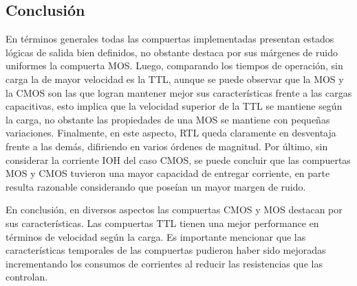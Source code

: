 \subsection{Conclusión}
En t\'erminos generales todas las compuertas implementadas presentan estados l\'ogicas de salida bien definidos, no obstante destaca por sus m\'argenes de ruido uniformes la compuerta MOS.
Luego, comparando los tiempos de operaci\'on, sin carga la de mayor velocidad es la TTL, aunque se puede observar que la MOS y la CMOS son las que logran mantener mejor sus caracter\'isticas
frente a las cargas capacitivas, esto implica que la velocidad superior de la TTL se mantiene seg\'un la carga, no obstante las propiedades de una MOS se mantiene con peque\~nas variaciones. Finalmente, en este aspecto,
RTL queda claramente en desventaja frente a las dem\'as, difiriendo en varios \'ordenes de magnitud.
Por \'ultimo, sin considerar la corriente IOH del caso CMOS, se puede concluir que las compuertas MOS y CMOS tuvieron una mayor capacidad de entregar corriente,
en parte resulta razonable considerando que pose\'ian un mayor margen de ruido.

En conclusi\'on, en diversos aspectos las compuertas CMOS y MOS destacan por sus caracter\'isticas. Las compuertas TTL tienen una mejor performance en t\'erminos de velocidad seg\'un la carga.
Es importante mencionar que las caracter\'isticas temporales de las compuertas pudieron haber sido mejoradas incrementando los consumos de corrientes al reducir las resistencias que las controlan.